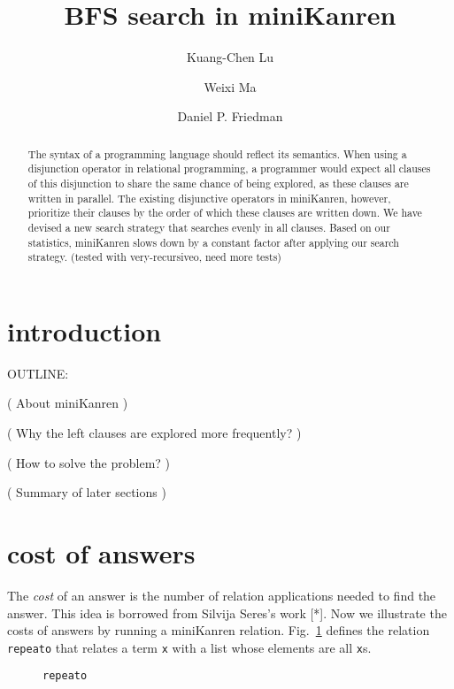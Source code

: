 \documentclass[format=acmlarge, review=true, authordraft=true]{acmart}
\title{BFS search in miniKanren}
\author{Kuang-Chen Lu}
\affiliation{Indiana University}
\author{Weixi Ma}
\affiliation{Indiana University}
\author{Daniel P. Friedman}
\affiliation{Indiana University}
\begin{document}
\begin{abstract}

The syntax of a programming language should reflect its semantics.
When using a disjunction operator in relational programming, a programmer would
expect all clauses of this disjunction to share the same chance of being explored,
as these clauses are written in parallel. The existing disjunctive operators in miniKanren,
however, prioritize their clauses by the order of which these clauses are written down.
We have devised a new search strategy that searches evenly in all clauses.
Based on our statistics, miniKanren slows down by a constant factor after applying our search strategy.
(tested with very-recursiveo, need more tests)


\end{abstract}

\maketitle

\section{introduction}

OUTLINE:

( About miniKanren )

( Why the left clauses are explored more frequently? )


( How to solve the problem? )

( Summary of later sections )

\section{cost of answers}


The \emph{cost} of an answer is the number of relation applications needed to
find the answer. This idea is borrowed from Silvija Seres's work [*].
Now we illustrate the costs of answers by running a miniKanren relation.
Fig.~\ref{def-repeato} defines the relation \texttt{repeato} that 
relates a term \texttt{x} with a list whose elements are all \texttt{x}s.

\begin{figure}
  
  \caption{\texttt{repeato}}
  \label{def-repeato}
\end{figure}
\end{document}
